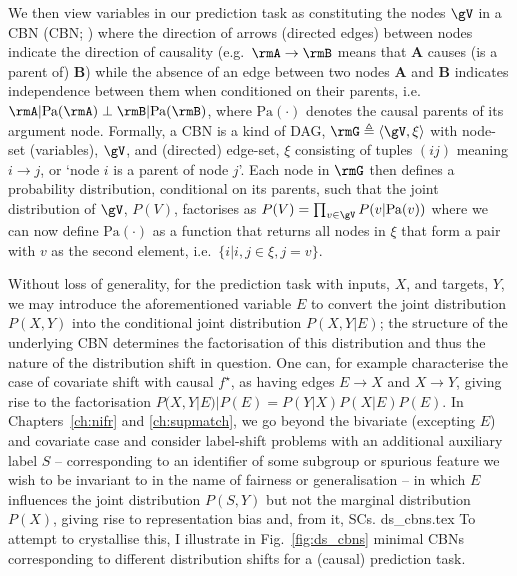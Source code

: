 We then view variables in our prediction task as constituting the nodes \( \gV \) in a \acl{CBN}
(\acs{CBN}; \citealp{pearl1995bayesian}) where the direction of arrows (directed edges) between
nodes indicate the direction of causality (e.g.\ \(\rmA \to \rmB \) means that \textbf{A} causes
(is a parent of) \textbf{B}) while the absence of an edge between two nodes \textbf{A} and
\textbf{B} indicates independence between them when conditioned on their parents, i.e.\ \( \rmA |
\text{Pa}(\rmA) \perp \rmB | \text{Pa}(\rmB) \), where \( \text{Pa}(\cdot) \) denotes the causal
parents of its argument node.
%
Formally, a \ac{CBN} is a kind of \ac{DAG}, \(\rmG \triangleq \langle \gV, \xi
\rangle \) with node-set (variables), \(\gV\), and (directed) edge-set, \(\xi\) consisting of
tuples \((ij)\) meaning \(i \to j \), or `node \(i\) is a parent of node \(j\)'.
%
Each node in \( \rmG \) then defines a probability distribution, conditional on its parents, such
that the joint distribution of \(\gV\), \( P(V) \), factorises as \( P(V) = \prod_{v \in \gV} P(v |
\text{Pa}(v)) \) where we can now define \(\text{Pa}(\cdot)\) as a function that returns all nodes
in \(\xi\) that form a pair with \(v\) as the second element, i.e.\ \( \{ i | i,j \in \xi, j = v \}
\).
%

Without loss of generality, for the prediction task with inputs, \(X\), and targets, \(Y\), we may
introduce the aforementioned variable \(E\) to convert the joint distribution \(P(X, Y)\) into the
conditional joint distribution \( P(X, Y | E ) \); the structure of the underlying \ac{CBN}
determines the factorisation of this distribution and thus the nature of the distribution shift in
question.
%
One can, for example characterise the case of covariate shift with causal \(f^\star\), as having
edges  \(E \to X\) and \( X \to Y \), giving rise to the factorisation \( P(X, Y | E) | P(E) =
P(Y|X)P(X|E)P(E) \). 
%
In Chapters~\ref{ch:nifr} and \ref{ch:supmatch}, we go beyond the bivariate (excepting \( E \)) and
covariate case and consider label-shift problems with an additional auxiliary label \(S\) --
corresponding to an identifier of some subgroup or spurious feature we wish to be invariant to in
the name of fairness or generalisation --  in which \(E\) influences the joint distribution \( P(S,
Y) \) but not the marginal distribution \(P(X)\), giving rise to representation bias and, from it,
\acp{SC}.
%
%
{ds_cbns.tex}
%
To attempt to crystallise this, I illustrate in Fig.~\ref{fig:ds_cbns} minimal \acp{CBN}
corresponding to different distribution shifts for a (causal) prediction task.

